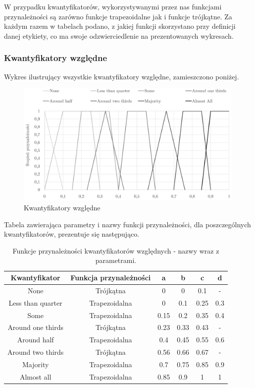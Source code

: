 \documentclass{classrep}
\begin{document}
W przypadku kwantyfikatorów, wykorzystywanymi przez nas funkcjami przynależności są zarówno funkcje trapezoidalne jak i funkcje trójkątne. Za każdym razem w tabelach podano, z jakiej funkcji skorzystano przy definicji danej etykiety, co ma swoje odzwierciedlenie na prezentowanych wykresach.

\subsubsection{Kwantyfikatory względne}
Wykres ilustrujący wszystkie kwantyfikatory względne, zamieszczono poniżej.
\begin{figure}[H]
	\centering
	\includegraphics[width=0.99\textwidth]{Pictures/TermsCharts/nonabsolute.png}
	\caption{Kwantyfikatory względne}
\end{figure}

Tabela zawierająca parametry i nazwy funkcji przynależności, dla poszczególnych kwantyfikatorów, prezentuje się następująco.
\begin{table}[H]
	\centering
	\begin{tabular}{c c c c c c} 
		\hline
		\textbf{Kwantyfikator} & \textbf{Funkcja przynależności} & \textbf{a} & \textbf{b} & \textbf{c} & \textbf{d}\\ [0.5ex] 
		\hline
		\hline 
None	 			 & Trójkątna 		& 0 & 0 & 0.1 & - \\
Less than quarter		 & Trapezoidalna  	& 0 & 0.1 & 0.25 & 0.3 \\
Some				 & Trapezoidalna   & 0.15 & 0.2 & 0.35 & 0.4 \\
Around one thirds		 & Trójkątna 		& 0.23 & 0.33 & 0.43 & - \\
Around half	 		 & Trapezoidalna 	& 0.4 & 0.45 & 0.55 & 0.6 \\
Around two thirds		 & Trójkątna 		& 0.56 & 0.66 & 0.67 & - \\
Majority	 			 & Trapezoidalna 	& 0.7 & 0.75 & 0.85 & 0.9 \\
Almost all			 & Trapezoidalna 	& 0.85 & 0.9 & 1 & 1 \\
		\hline
	\end{tabular}
	\caption{Funkcje przynależności kwantyfikatorów względnych - nazwy wraz z parametrami.}
\end{table}
\end{document}
